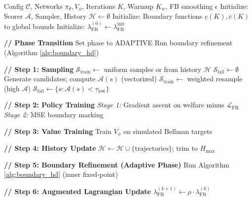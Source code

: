 \begin{algorithm}[H]
\caption{Deep Ramsey Algorithm for Heterogeneous Agents}
\label{alg:het_agent_v2}
\begin{algorithmic}[1]
\Require Config $\mathcal{C}$, Networks $\pi_\theta, V_\phi$, Iterations $K$, Warmup $K_w$, FB smoothing $\epsilon$
\State Initialize: Scorer $\mathcal{A}$, Sampler, History $\mathcal{H} \gets \emptyset$
\State Initialize: Boundary functions $\underline{c}(K), \bar{c}(K)$ to global bounds
\State Initialize: $\lambda_{\text{FB}}^{(0)} \gets \lambda_{\text{FB}}^{\text{init}}$

 
    
    \State \textbf{// Phase Transition}
        \State Set phase to ADAPTIVE
        \State Run boundary refinement (Algorithm \ref{alg:boundary_hd})
    \EndIf
    
    \State
    \State \textbf{// Step 1: Sampling}
        \State $\mathcal{S}_{\text{train}} \gets$ uniform samples or from history $\mathcal{H}$
        \State $\mathcal{S}_{\text{fail}} \gets \emptyset$
    \Else
        \State Generate candidates; compute $\mathcal{A}(s)$ (vectorized)
        \State $\mathcal{S}_{\text{train}} \gets$ weighted resample (high $\mathcal{A}$)
        \State $\mathcal{S}_{\text{fail}} \gets \{s : \mathcal{A}(s) < \tau_{\text{low}}\}$
    \EndIf
    
    \State
    \State \textbf{// Step 2: Policy Training}
    \State \textit{Stage 1:} Gradient ascent on welfare minus $\mathcal{L}_{\text{FB}}$
        \State \textit{Stage 2:} MSE boundary marking
    \EndIf
    
    \State
    \State \textbf{// Step 3: Value Training}
    \State Train $V_\phi$ on simulated Bellman targets
    
    \State
    \State \textbf{// Step 4: History Update}
    \State $\mathcal{H} \gets \mathcal{H} \cup \{\text{trajectories}\}$; trim to $H_{\max}$
    
    \State
    \State \textbf{// Step 5: Boundary Refinement (Adaptive Phase)}
        \State Run Algorithm \ref{alg:boundary_hd} (inner fixed-point)
    \EndIf
    
    \State
    \State \textbf{// Step 6: Augmented Lagrangian Update}
        \State $\lambda_{\text{FB}}^{(k+1)} \gets \rho \cdot \lambda_{\text{FB}}^{(k)}$
    \EndIf
    
\EndFor
\end{algorithmic}
\end{algorithm}



